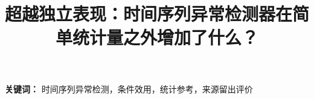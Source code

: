 \documentclass[letterpaper]{article}
\title{超越独立表现：时间序列异常检测器在简单统计量之外增加了什么？}
\renewenvironment{keywords}{\par\smallskip\noindent\textbf{关键词：}}{\par}
\begin{document}
\raggedbottom
\maketitle

\begin{keywords}
时间序列异常检测，条件效用，统计参考，来源留出评价
\end{keywords}

\clearpage
\balance


\end{document}
